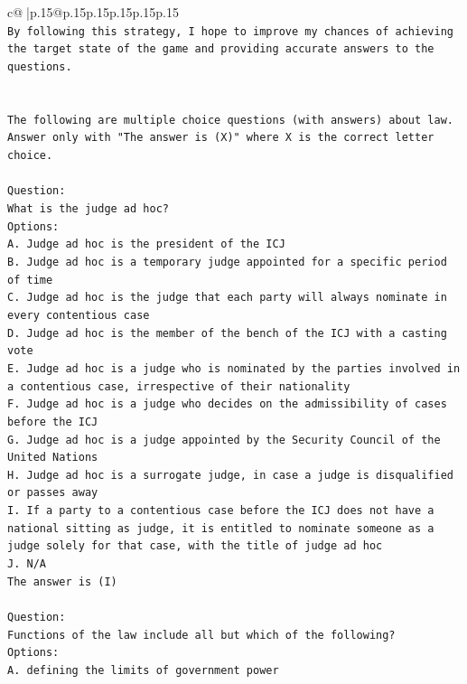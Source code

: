 \documentclass{article}
\begin{document}
{\begin{supertabular}{c@{$\;$}|p{.15\linewidth}@{}p{.15\linewidth}p{.15\linewidth}p{.15\linewidth}p{.15\linewidth}p{.15\linewidth}}
{{{\\ 
\texttt{By following this strategy, I hope to improve my chances of achieving the target state of the game and providing accurate answers to the questions.} \\
\\ 
\\ 
\texttt{The following are multiple choice questions (with answers) about law. Answer only with "The answer is (X)" where X is the correct letter choice.} \\
\\ 
\texttt{Question:} \\
\texttt{What is the judge ad hoc?} \\
\texttt{Options:} \\
\texttt{A. Judge ad hoc is the president of the ICJ} \\
\texttt{B. Judge ad hoc is a temporary judge appointed for a specific period of time} \\
\texttt{C. Judge ad hoc is the judge that each party will always nominate in every contentious case} \\
\texttt{D. Judge ad hoc is the member of the bench of the ICJ with a casting vote} \\
\texttt{E. Judge ad hoc is a judge who is nominated by the parties involved in a contentious case, irrespective of their nationality} \\
\texttt{F. Judge ad hoc is a judge who decides on the admissibility of cases before the ICJ} \\
\texttt{G. Judge ad hoc is a judge appointed by the Security Council of the United Nations} \\
\texttt{H. Judge ad hoc is a surrogate judge, in case a judge is disqualified or passes away} \\
\texttt{I. If a party to a contentious case before the ICJ does not have a national sitting as judge, it is entitled to nominate someone as a judge solely for that case, with the title of judge ad hoc} \\
\texttt{J. N/A} \\
\texttt{The answer is (I)} \\
\\ 
\texttt{Question:} \\
\texttt{Functions of the law include all but which of the following?} \\
\texttt{Options:} \\
\texttt{A. defining the limits of government power} \\
}}}
\end{supertabular}}
\end{document}
